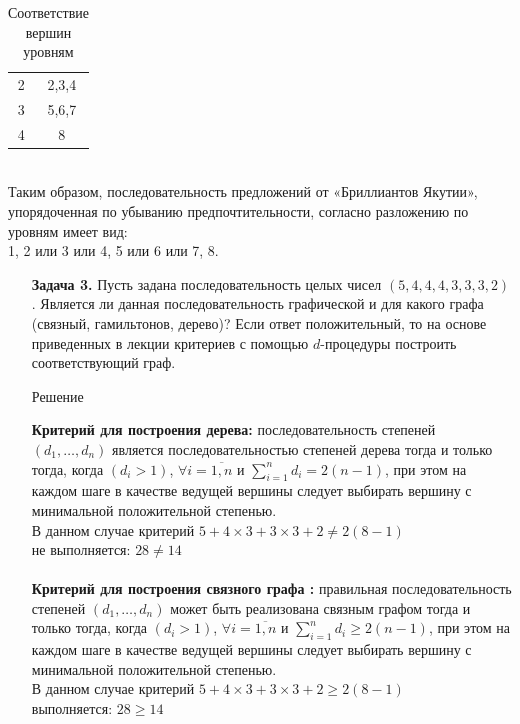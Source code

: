 \documentclass{article}
\begin{document}
\begin{enumerate}
\begin{table}[ht]
\begin{tabular}{c|c}
    2 & 2,3,4 \\
    3 & 5,6,7 \\
    4 & 8 \\ \hline
    \end{tabular}
    \caption{Соответствие вершин уровням}
    \label{tab:2_lvls}
\end{table}\\
Таким образом, последовательность предложений от «Бриллиантов Якутии», упорядоченная по убыванию
предпочтительности, согласно разложению по уровням имеет вид:\\
1, 2 или 3 или 4, 5 или 6 или 7, 8. 
\end{enumerate}


\clearpage%
\begin{enumerate}
\item[\textbf{Задача 3.}] Пусть задана последовательность целых чисел $(5,4,4,4,3,3,3,2)$. Является ли данная последовательность графической и для какого графа (связный, гамильтонов, дерево)? Если ответ положительный, то на основе приведенных в лекции критериев с помощью $d$-процедуры построить соответствующий
граф.\\ 
\begin{center}
Решение 
\end{center}
\textbf{Критерий для построения дерева:} последовательность степеней $(d_1, \dots, d_n)$ является последовательностью степеней дерева тогда и только тогда, когда $(d_i > 1)$, $\forall i = \overline{1,n}$ и $\sum_{i=1}^{n} d_i = 2 (n - 1)$, при этом на каждом шаге в качестве ведущей вершины следует выбирать вершину с минимальной положительной степенью.\\
В данном случае критерий \qquad $5+4\times3+3\times3+2 \neq 2 (8-1)$ \\
не выполняется: \qquad \qquad \qquad \quad$28 \neq 14$
\\
\\
\textbf{Критерий для построения связного графа :} правильная последовательность степеней $(d_1, \dots, d_n)$ может быть реализована связным графом тогда и только тогда, когда $(d_i > 1)$, $\forall i = \overline{1,n}$ и $\sum_{i=1}^{n} d_i \ge 2 (n - 1)$, при этом на каждом шаге в качестве ведущей вершины следует выбирать вершину с минимальной положительной степенью.\\
В данном случае критерий \qquad $5+4\times3+3\times3+2 \ge 2 (8-1)$ \\
выполняется: \qquad \qquad \qquad \qquad$28 \ge 14$
\\

\end{enumerate}
\end{document}
